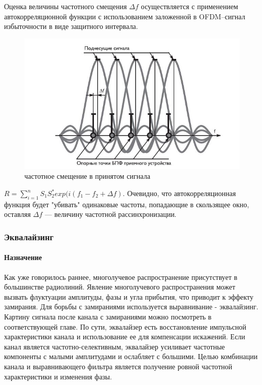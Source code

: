 Оценка величины частотного смещения $\Delta f $ осуществляется с применением автокорреляционной функции с использованием заложенной в OFDM--сигнал избыточности в виде защитного интервала.

\begin{figure}[!h]
\includegraphics{freqDesync}
\caption{частотное смещение в принятом сигнала}
\end{figure}


$R = \sum_{i=1}^{n}S_1 S_2^* exp{(i(f_1 - f_2 + \Delta f )}$. Очевидно, что автокорреляционная функция будет "убивать" одинаковые частоты, попадающие в скользящее окно, оставляя $\Delta f $  --- величину частотной рассинхронизации.  


\subsubsection{Эквалайзинг}

\paragraph {Назначение}
Как уже говорилось раннее, многолучевое распространение присутствует в большинстве радиолиний. Явление многолучевого распространения может вызвать флуктуации амплитуды, фазы и угла прибытия, что приводит к эффекту замирания. Для борьбы с замираниями используется выравнивание - эквалайзинг. Картину сигнала после канала с замираниями можно посмотреть в соответствующей главе.
По сути, эквалайзер есть  восстановление импульсной характеристики канала и использование ее для компенсации искажений. Если канал является частотно-селективным, эквалайзер усиливает частотные компоненты с малыми амплитудами и ослабляет с большими. Целью комбинации канала и выравнивающего фильтра является получение ровной частотной характеристики и изменения фазы. 

